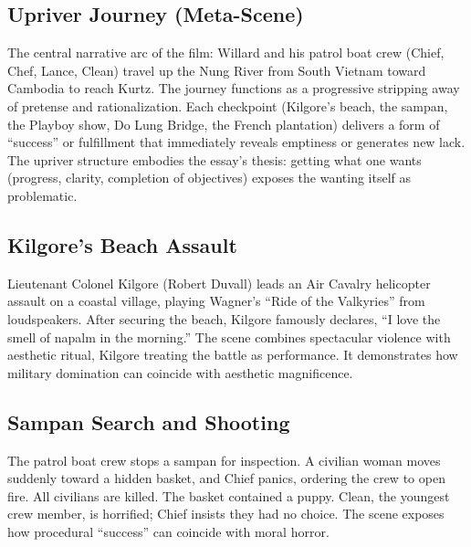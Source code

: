 \begin{minipage}{\textwidth}
	\subsection*{Upriver Journey (Meta-Scene)}
	\label{scene:upriver-journey}

	The central narrative arc of the film: Willard and his patrol boat crew (Chief, Chef, Lance,
	Clean) travel up the Nung River from South Vietnam toward Cambodia to reach Kurtz. The journey
	functions as a progressive stripping away of pretense and rationalization. Each checkpoint
	(Kilgore's beach, the sampan, the Playboy show, Do Lung Bridge, the French plantation)
	delivers a form of ``success'' or fulfillment that immediately reveals emptiness or generates
	new lack. The upriver structure embodies the essay's thesis: getting what one wants (progress,
	clarity, completion of objectives) exposes the wanting itself as problematic.
\end{minipage}

\begin{minipage}{\textwidth}
	\subsection*{Kilgore's Beach Assault}
	\label{scene:kilgore-beach}

	Lieutenant Colonel Kilgore (Robert Duvall) leads an Air Cavalry helicopter assault on a coastal
	village, playing Wagner's ``Ride of the Valkyries'' from loudspeakers. After securing the
	beach, Kilgore famously declares, ``I love the smell of napalm in the morning.'' The scene
	combines spectacular violence with aesthetic ritual, Kilgore treating the battle as
	performance. It demonstrates how military domination can coincide with aesthetic magnificence.
\end{minipage}

\begin{minipage}{\textwidth}
	\subsection*{Sampan Search and Shooting}
	\label{scene:sampan}

	The patrol boat crew stops a sampan for inspection. A civilian woman moves suddenly toward a
	hidden basket, and Chief panics, ordering the crew to open fire. All civilians are killed. The
	basket contained a puppy. Clean, the youngest crew member, is horrified; Chief insists they
	had no choice. The scene exposes how procedural ``success'' can coincide with moral horror.
\end{minipage}

